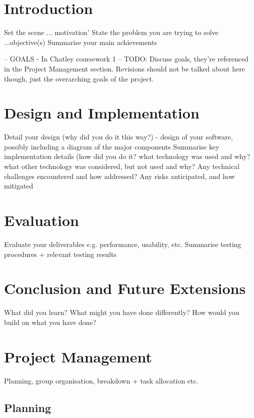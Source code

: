 \documentclass[a4wide, 11pt]{article} \usepackage{a4, fullpage}
\begin{document}
\section{Introduction}

        Set the scene ... motivation'
        State the problem you are trying to solve ...objective(s)
        Summarise your main achievements 

        -- GOALS - In Chatley coursework 1 --
        TODO: Discuss goals, they're referenced in the Project Management
        section. Revisions should not be talked about here though, just the
        overarching goals of the project.

\section{Design and Implementation}

        Detail your design (why did you do it this way?) - design of your software, possibly including a diagram of the major components
        Summarise key implementation details (how did you do it? what technology was used and why? what other technology was considered, but not used and why?
        Any technical challenges encountered and how addressed?
        Any risks anticipated, and how mitigated 

\section{Evaluation}

        Evaluate your deliverables e.g. performance, usability, etc.
        Summarise testing procedures + relevant testing results 

\section{Conclusion and Future Extensions}

        What did you learn? What might you have done differently?
        How would you build on what you have done? 

\section{Project Management}

        Planning, group organisation, breakdown + task allocation etc.

\subsection{Planning}
\end{document}
